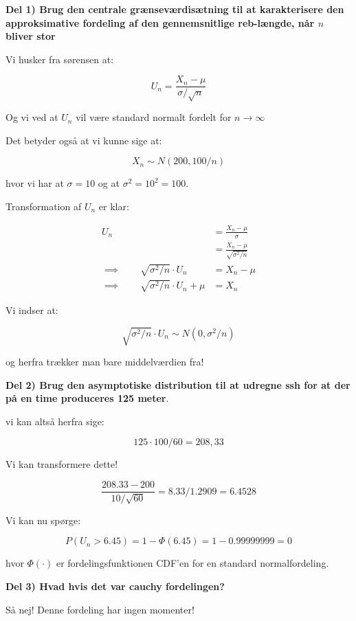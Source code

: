 \textbf{Del 1) Brug den centrale grænseværdisætning til at karakterisere den approksimative fordeling af den gennemsnitlige reb-længde, når $n$ bliver stor}

Vi husker fra sørensen at:

\begin{equation}
    U_n = \frac{X_n - \mu}{\sigma / \sqrt{n}}
\end{equation}

Og vi ved at $U_n$ vil være standard normalt fordelt for $n \rightarrow \infty$

Det betyder også at vi kunne sige at:

\begin{equation}
    X_n \sim N(200, 100 / n)
\end{equation}

hvor vi har at $\sigma = 10$ og at $\sigma^2 = 10^2 = 100$.

Transformation af $U_n$ er klar:

\begin{align}
    U_n
    &= \frac{X_n - \mu}{\sigma} \\
    &= \frac{X_n - \mu}{\sqrt{\sigma^2 / n}} \\
    \implies \qquad \sqrt{\sigma^2 / n} \cdot U_n &= X_n - \mu \\
    \implies \qquad \sqrt{\sigma^2 / n} \cdot  U_n  + \mu &= X_n
\end{align}

Vi indser at:

\begin{equation}
    \sqrt{\sigma^2 / n} \cdot U_n \sim N(0, \sigma^2 / n)
\end{equation}

og herfra trækker man bare middelværdien fra!

\textbf{Del 2) Brug den asymptotiske distribution til at udregne ssh for at der på en time produceres 125 meter}.

vi kan altså herfra sige:

\begin{equation}
    125 \cdot 100 / 60 = 208,33
\end{equation}

Vi kan transformere dette!

\begin{equation}
    \frac{208.33 - 200}{10 / \sqrt{60}} = 8.33 / 1.2909 = 6.4528
\end{equation}

Vi kan nu spørge:

\begin{equation}
    P(U_n > 6.45) = 1 - \Phi(6.45) = 1 - 0.99999999 = 0
\end{equation}

hvor $\Phi(\cdot)$ er fordelingsfunktionen CDF'en for en standard normalfordeling.

\textbf{Del 3) Hvad hvis det var cauchy fordelingen?}

Så nej! Denne fordeling har ingen momenter!
